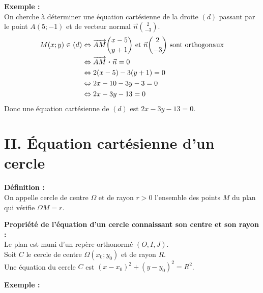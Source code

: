 \documentclass[11pt,a4paper]{article}
\newcommand{\pdt}{\mathbin{\vcenter{\hbox{\scalebox{0.6}{\textbullet}}}}}
\begin{document}
\textbf{Exemple :} ~\\
On cherche à déterminer une équation cartésienne de la droite $(d)$ passant par le point $A(5;-1)$ et de vecteur normal $\displaystyle \vec{n} \binom{2}{-3}$.
\begin{equation*}
  \begin{split}
    M(x;y)\in (d) & \Leftrightarrow \overrightarrow{AM} \binom{x-5}{y+1} \text{ et } \vec{n} \binom{2}{-3} \text{ sont orthogonaux}\\
    & \Leftrightarrow \overrightarrow{AM}\pdt\vec{n} = 0 \\
    & \Leftrightarrow 2(x-5)-3(y+1)=0 \\
    & \Leftrightarrow 2x-10-3y-3=0 \\
    & \Leftrightarrow 2x-3y-13=0
  \end{split}
\end{equation*}
Donc une équation cartésienne de $(d)$ est $2x-3y-13=0$.

\newpage

\section*{II. Équation cartésienne d'un cercle}

\begin{mdframed}[style=definitionStyle]
  \textbf{Définition :} ~\\
  On appelle cercle de centre $\Omega$ et de rayon $r>0$ l'ensemble des points $M$ du plan qui vérifie $\Omega M=r$.
\end{mdframed}

\begin{mdframed}[style=proprieteStyle]
  \textbf{Propriété de l'équation d'un cercle connaissant son centre et son rayon :} ~\\
  Le plan est muni d'un repère orthonormé $(O,I,J)$. \\
  Soit $C$ le cercle de centre $\Omega(x_0;y_0)$ et de rayon $R$. \\
  Une équation du cercle $C$ est $(x-x_0)^2+(y-y_0)^2=R^2$.
\end{mdframed}

\textbf{Exemple :} ~\\
\end{document}
